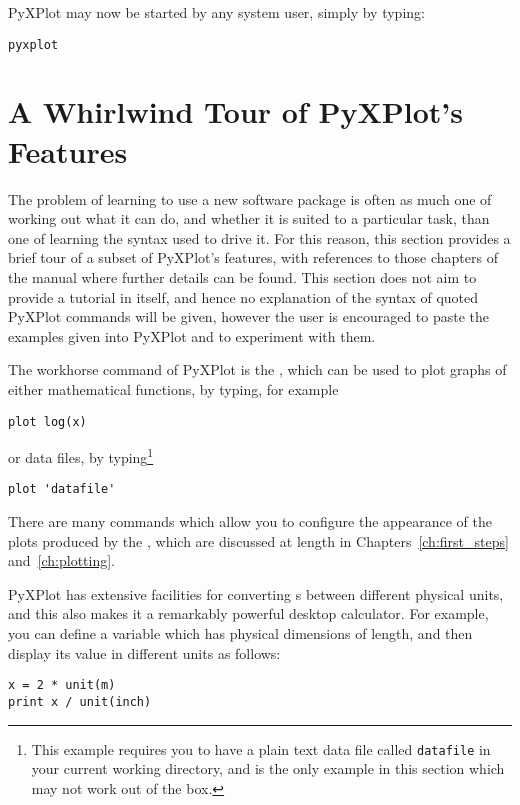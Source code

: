 PyXPlot may now be started by any system user, simply by typing:

\begin{verbatim}
pyxplot
\end{verbatim}

\section{A Whirlwind Tour of PyXPlot's Features}

The problem of learning to use a new software package is often as much one of
working out what it can do, and whether it is suited to a particular task, than
one of learning the syntax used to drive it. For this reason, this section
provides a brief tour of a subset of PyXPlot's features, with references to
those chapters of the manual where further details can be found. This section
does not aim to provide a tutorial in itself, and hence no explanation of the
syntax of quoted PyXPlot commands will be given, however the user is encouraged
to paste the examples given into PyXPlot and to experiment with them.

The workhorse command of PyXPlot is the , which can be used to
plot graphs of either mathematical functions, by typing, for example

\begin{verbatim}
plot log(x)
\end{verbatim}

\noindent or data files, by typing\footnote{This example requires you to have a
plain text data file called {\tt datafile} in your current working directory,
and is the only example in this section which may not work out of the box.}

\begin{verbatim}
plot 'datafile'
\end{verbatim}

\noindent There are many commands which allow you to configure the appearance
of the plots produced by the , which are discussed at length in
Chapters~\ref{ch:first_steps} and~\ref{ch:plotting}.

PyXPlot has extensive facilities for converting \datafile s between different
physical units, and this also makes it a remarkably powerful desktop
calculator. For example, you can define a variable which has physical
dimensions of length, and then display its value in different units as follows:

\begin{verbatim}
x = 2 * unit(m)
print x / unit(inch)
\end{verbatim}

